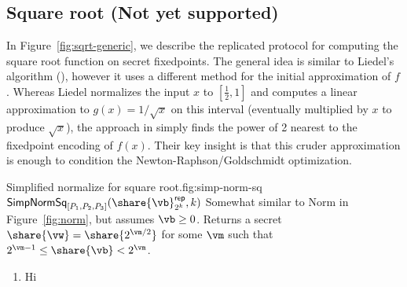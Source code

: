 \subsection{Square root (Not yet supported)}
\label{subsec:sqrt}

In Figure~\ref{fig:sqrt-generic}, we describe the replicated protocol for computing
the square root function on secret fixedpoints. The general idea is similar to
Liedel's algorithm (\cite{Liedel2012SecureDC}), however it uses a different method
for the initial approximation of $f$. Whereas Liedel normalizes the input $x$ to
$[\frac{1}{2}, 1]$ and computes a linear approximation to $g(x) = 1 / \sqrt{x}$ on
this interval (eventually multiplied by $x$ to produce $\sqrt{x}$), the approach in
\cite{cryptoeprint:2019:354} simply finds the power of 2 nearest to the fixedpoint
encoding of $f(x)$. Their key insight is that this cruder approximation is enough
to condition the Newton-Raphson/Goldschmidt optimization.

\begin{Boxfig}{Simplified normalize for square root.}{fig:simp-norm-sq}
  {$\mathsf{SimpNormSq}_{[P_1, P_2, P_3]}(\share{\vb}^\mathsf{rep}_{2^k}, k)$}
  Somewhat similar to Norm in Figure~\ref{fig:norm}, but assumes $\vb \geq 0$.
  Returns a secret $\share{\vw} = \share{2^{\vm/2}}$ for some $\vm$ such that
  $2^{\vm-1} \leq \share{\vb} < 2^\vm$.
  \begin{enumerate}
    \item Hi
  \end{enumerate}
\end{Boxfig}

